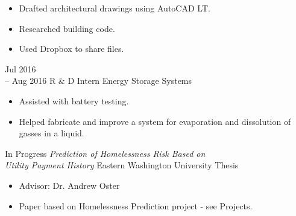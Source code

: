 \documentclass[11pt]{developercv} %
\newcommand{\vsp}{\vspace{-10pt}}
\begin{document}
\begin{entrylist}
{\begin{itemize}
			\item Drafted architectural drawings using AutoCAD LT.
			\item Researched building code.
			\item Used Dropbox to share files.
		\end{itemize}}
	\entry
		{Jul 2016 \\
		-- Aug 2016}
		{R \& D Intern}
		{Energy Storage Systems}
		{\vspace{-0.5cm}\begin{itemize}
			\item Assisted with battery testing.
			\item Helped fabricate and improve a system for evaporation and dissolution of gasses in a liquid.
		\end{itemize}}
\end{entrylist}
\vsp

\begin{entrylist}
	\entry
		{In Progress}
		{\textit{Prediction of Homelessness Risk Based on \\Utility Payment
		History}}
		{Eastern Washington University Thesis}
		{\vspace{-0.5cm}\begin{itemize}
			\item Advisor: Dr. Andrew Oster
			\item Paper based on Homelessness Prediction project - see Projects.
		\end{itemize}}
\end{entrylist}
\end{document}
